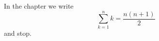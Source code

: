 In the chapter we write
\begin{equation*}
  \sum_{k=1}^n k = \frac{n(n+1)}{2}
\end{equation*}
and stop.
